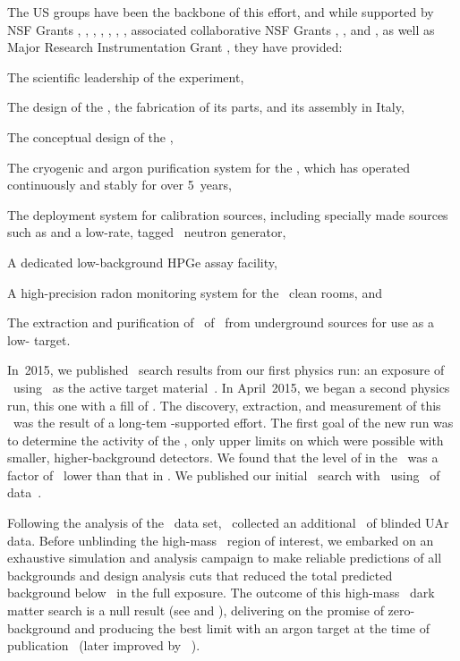 The US groups have been the backbone of this effort, and while supported by NSF Grants , , , , , , , associated collaborative NSF Grants , ,  and , as well as Major Research Instrumentation Grant , they have provided:
\begin{compactitem}
\item The scientific leadership of the experiment,
\item The design of the \LArTPC, the fabrication of its parts, and its assembly in Italy,
\item The conceptual design of the \LSV,
\item The cryogenic and argon purification system for the \TPC, which has operated continuously and stably for over 5~years,
\item The deployment system for calibration sources, including specially made sources such as  and a low-rate, tagged \DD\ neutron generator,
\item A dedicated low-background HPGe assay facility, 
\item A high-precision radon monitoring system for the \DSs\ clean rooms, and
\item The extraction and purification of \DSfUArMassDelivered\ of \UAr\ from underground sources for use as a low- target.
\end{compactitem}

In~2015, we published \WIMP\ search results from our first physics run: an exposure of \DSfAArLiveDay\ using  \AAr\ as the active target material~\cite{Agnes:2015gu}.  In April~2015, we began a second physics run, this one with a fill of \UAr.  The discovery, extraction, and measurement of this \UAr\ was the result of a long-tem \NSF-supported effort.  The first goal of the new run was to determine the activity of the \UAr, only upper limits on which were possible with smaller, higher-background detectors.  We found that the level of  in the \UAr\ was a factor of \DSfAAronUArratio\ lower than that in \AAr.  We published our initial \WIMP\ search with \UAr\ using \DSfUArLiveDay\ of data~\cite{Agnes:2016fz}.

Following the analysis of the \DSfUArLiveDay\ data set, \DSfs\ collected an additional \DSfDdLTPostQualCut\ of blinded UAr data. Before unblinding the high-mass \WIMP\ region of interest, we embarked on an exhaustive simulation and analysis campaign to make reliable predictions of all backgrounds and design analysis cuts that reduced the total predicted background below \BackgroundFreeRequirement\ in the full exposure.  The outcome of this high-mass \WIMP\ dark matter search is a null result (see  and ), delivering on the promise of zero-background and producing the best limit with an argon target at the time of publication~\cite{Agnes:2018ep} (later improved by \DEAP~\cite{Amaudruz:2018gr}).

